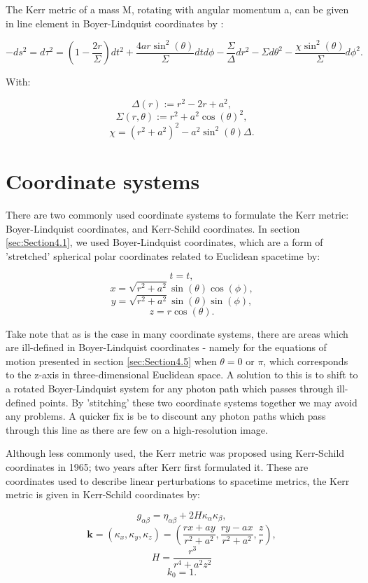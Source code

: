 \documentclass[oneside,openright,frontopenright, singlespacing]{dmathesis}
\begin{document}
\vspace{1em}
	The Kerr metric of a mass M, rotating with angular momentum a, can be given in line element in Boyer-Lindquist coordinates by \cite{boyer1967maximal}:

	\[-ds^2=d\tau^{2} = \left(1-\frac{2r}{\Sigma}\right)dt^2+\frac{4ar\sin^2(\theta)}{\Sigma}dtd\phi-\frac{\Sigma}{\Delta}dr^2-{\Sigma}d\theta^2-\frac{\chi\sin^2(\theta)}{\Sigma}d\phi^2.\]

	With:
	
	\[\Delta(r) := r^2 - 2r + a^2,\]
	\[\Sigma(r, \theta) := r^2 + a^2\cos(\theta)^2,\]
	\[\chi = (r^2+a^2)^2-a^2\sin^2(\theta)\Delta.\]

\section{Coordinate systems}\label{sec:Section4.2}

	There are two commonly used coordinate systems to formulate the Kerr metric: Boyer-Lindquist coordinates\cite{boyer1967maximal}, and Kerr-Schild coordinates\cite{debney1969solutions}. In section \ref{sec:Section4.1}, we used Boyer-Lindquist coordinates, which are a form of 'stretched' spherical polar coordinates related to Euclidean spacetime by:

	\[t=t,\]
	\[x = \sqrt{r^2+a^2}\sin(\theta)\cos(\phi),\]
	\[y = \sqrt{r^2+a^2}\sin(\theta)\sin(\phi),\]
	\[z = r\cos(\theta).\]

	Take note that as is the case in many coordinate systems, there are areas which are ill-defined in Boyer-Lindquist coordinates - namely for the equations of motion presented in section \ref{sec:Section4.5} when $\theta=0\mbox{ or }\pi$, which corresponds to the z-axis in three-dimensional Euclidean space. A solution to this is to shift to a rotated Boyer-Lindquist system for any photon path which passes through ill-defined points. By 'stitching' these two coordinate systems together we may avoid any problems. A quicker fix is be to discount any photon paths which pass through this line as there are few on a high-resolution image.

\vspace{1em}
	Although less commonly used, the Kerr metric was proposed using Kerr-Schild coordinates in 1965; two years after Kerr first formulated it. These are coordinates used to describe linear perturbations to spacetime metrics, the Kerr metric is given in Kerr-Schild coordinates by:

	\[g_{\alpha\beta} = \eta_{\alpha\beta} + 2H\kappa_{\alpha}\kappa_{\beta},\]
	\[\textbf{k} = (\kappa_x,\kappa_y,\kappa_z) = \left(\frac{rx+ay}{r^2+a^2},\frac{ry-ax}{r^2+a^2},\frac{z}{r}\right),\]
	\[H = \frac{r^{3}}{r^{4}+a^{2}z^{2}}\]
	\[k_0 = 1.\]
\end{document}
